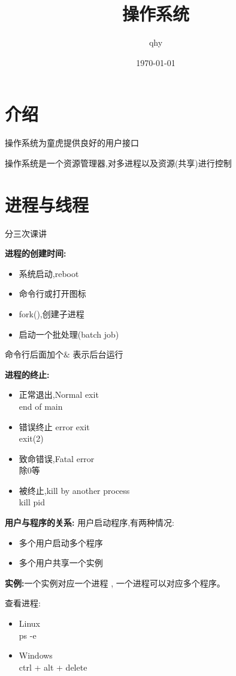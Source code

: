 \documentclass[UTF8,a4paper]{ctexart}
\author{ qhy }
\date{\today}
\title{操作系统}
\newcommand{\spaceline}{\vspace{\baselineskip}}
\begin{document}
  \maketitle
  \tableofcontents
  \newpage

  \section{介绍}

  操作系统为童虎提供良好的用户接口

  操作系统是一个资源管理器,对多进程以及资源(共享)进行控制

  \section{进程与线程}
  {\color{blue}分三次课讲}

  \textbf{进程的创建时间:}
  \begin{itemize}
    \item 系统启动,reboot
    \item 命令行或打开图标
    \item fork(),创建子进程
    \item 启动一个批处理(batch job)
  \end{itemize}

  {\color{blue}命令行后面加个$\&$ 表示后台运行}

  \spaceline
  \textbf{进程的终止:}
  \begin{itemize}
    \item 正常退出,Normal exit\\
    end of main
    \item 错误终止 error exit\\
    exit(2)
    \item 致命错误,Fatal error\\
    除0等
    \item 被终止,kill by another process\\
    kill pid
  \end{itemize}

  \textbf{用户与程序的关系:}
  用户启动程序,有两种情况:
  \begin{itemize}
    \item 多个用户启动多个程序
    \item 多个用户共享一个实例
  \end{itemize}

  \textbf{实例:}一个实例对应一个进程 , 一个进程可以对应多个程序。

  {\color{blue}查看进程:
  \begin{itemize}
    \item Linux\\
    ps -e
    \item Windows\\
    ctrl + alt + delete
  \end{itemize}}
\end{document}
